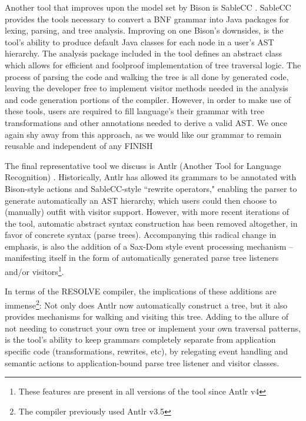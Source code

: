 \documentclass[times]{speauth}
\begin{document}
Another tool that improves upon the model set by Bison is SableCC \cite{gagnon:1998}. SableCC provides the tools necessary to convert a BNF grammar into Java packages for lexing, parsing, and tree analysis. Improving on one Bison's downsides, is the tool's ability to produce default Java classes for each node in a user's AST hierarchy. The analysis package included in the tool defines an abstract class which allows for efficient and foolproof implementation of tree traversal logic. The process of parsing the code and walking the tree is all done by generated code, leaving the developer free to implement visitor methods needed in the analysis and code generation portions of the compiler. However, in order to make use of these tools, users are required to fill language's their grammar with tree transformations and other annotations needed to derive a valid AST. We once again shy away from this approach, as we would like our grammar to remain reusable and independent of any FINISH


The final representative tool we discuss is Antlr (Another Tool for Language Recognition) \cite{parr:2011}. Historically, Antlr has allowed its grammars to be annotated with Bison-style actions and SableCC-style ``rewrite operators," enabling the parser to generate automatically an AST hierarchy, which users could then choose to (manually) outfit with visitor support. However, with more recent iterations of the tool, automatic abstract syntax construction has been removed altogether, in favor of concrete syntax (parse trees). Accompanying this radical change in emphasis, is also the addition of a Sax-Dom style event processing mechanism -- manifesting itself in the form of automatically generated parse tree listeners and/or visitors\footnote{These features are present in all versions of the tool since Antlr v4}.

In terms of the RESOLVE compiler, the implications of these additions are immense\footnote{The compiler previously used Antlr v3.5}: Not only does Antlr now automatically construct a tree, but it also provides mechanisms for walking and visiting this tree. Adding to the allure of not needing to construct your own tree or implement your own traversal patterns, is the tool's ability to keep grammars completely separate from application specific code (transformations, rewrites, etc), by relegating event handling and semantic actions to application-bound parse tree listener and visitor classes.
\end{document}
